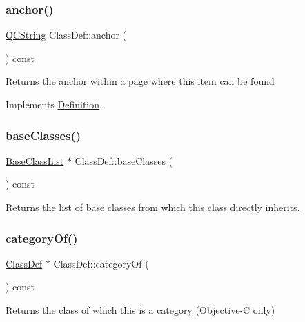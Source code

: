 \subsubsection{\texorpdfstring{anchor()}{anchor()}}
{\footnotesize\ttfamily \mbox{\hyperlink{class_q_c_string}{Q\+C\+String}} Class\+Def\+::anchor (\begin{DoxyParamCaption}{ }\end{DoxyParamCaption}) const\hspace{0.3cm}{\ttfamily [virtual]}}

Returns the anchor within a page where this item can be found 

Implements \mbox{\hyperlink{class_definition_a56e91f9b76f41208a22cfb2336871604}{Definition}}.

\mbox{\label{class_class_def_a680372e530fc79972086c9b940a72dcb}} 
\subsubsection{\texorpdfstring{baseClasses()}{baseClasses()}}
{\footnotesize\ttfamily \mbox{\hyperlink{class_base_class_list}{Base\+Class\+List}} $\ast$ Class\+Def\+::base\+Classes (\begin{DoxyParamCaption}{ }\end{DoxyParamCaption}) const}

Returns the list of base classes from which this class directly inherits. \mbox{\label{class_class_def_a01765ff58d2117372f4f46e04e5a55b1}} 
\subsubsection{\texorpdfstring{categoryOf()}{categoryOf()}}
{\footnotesize\ttfamily \mbox{\hyperlink{class_class_def}{Class\+Def}} $\ast$ Class\+Def\+::category\+Of (\begin{DoxyParamCaption}{ }\end{DoxyParamCaption}) const}

Returns the class of which this is a category (Objective-\/C only) \mbox{\label{class_class_def_a67e54a054e5063b25e7fe86257e3225c}} 
